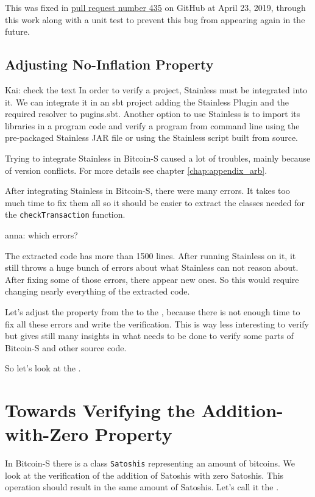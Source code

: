 \documentclass[runningheads]{llncs}
\newcommand{\todo}[1]{{\par \color{red}#1}}
\begin{document}
This was fixed in
\href{https://github.com/bitcoin-s/bitcoin-s/pull/435}{pull request
  number 435} on GitHub at April 23, 2019, through this work along
with a unit test to prevent this bug from appearing again in the
future.


\subsection{Adjusting No-Inflation Property}

\todo{Kai: check the text
In order to verify a project, Stainless must be integrated into it.
We can integrate it in an sbt project adding the Stainless Plugin 
and the required resolver to pugins.sbt. 
Another option to use Stainless is to import its libraries in a program code 
and verify a program from command line using the pre-packaged Stainless JAR file 
or using the Stainless script built from source.}
Trying to integrate Stainless in Bitcoin-S caused a lot of troubles,
mainly because of version conflicts.  For more details see chapter
\ref{chap:appendix_arb}.

After integrating Stainless in Bitcoin-S, there were many errors.  It
takes too much time to fix them all so it should be easier to extract
the classes needed for the \texttt{checkTransaction} function.
\todo{anna: which errors?}

The extracted code has more than 1500 lines.  After running Stainless
on it, it still throws a huge bunch of errors about what Stainless can
not reason about.  After fixing some of those errors, there appear new
ones.  So this would require changing nearly everything of the
extracted code.

Let's adjust the property from the  to the
, because there is not enough time to fix all
these errors and write the verification.  This is way less interesting
to verify but gives still many insights in what needs to be done to
verify some parts of Bitcoin-S and other source code.

So let's look at the .



\section{Towards Verifying the Addition-with-Zero Property}

\label{chap:verify_add}

In Bitcoin-S there is a class \texttt{Satoshis} representing an amount of bitcoins.
We look at the verification of the addition of Satoshis with zero Satoshis.
This operation should result in the same amount of Satoshis.
Let's call it the .
\end{document}
